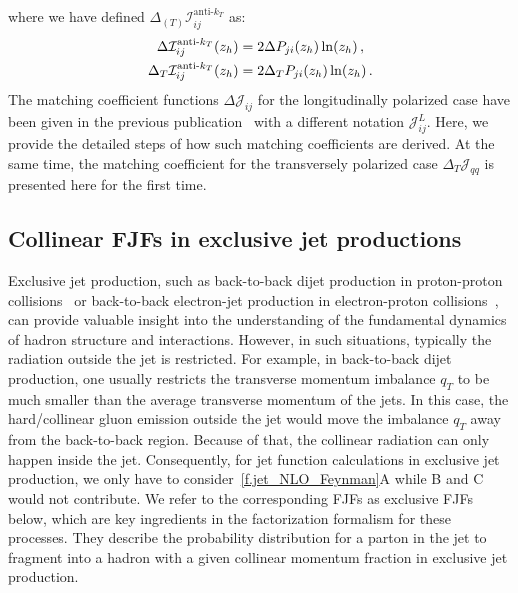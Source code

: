 \documentclass[a4paper, 11 pt]{article}
\begin{document}
where we have defined $\Delta_{(T)} \mathcal{I}_{ij}^{\text{anti-}k_T}$ as:
\begin{equation}
\begin{split}
\Delta \mathcal{I}_{ij}^{\text{anti-}k_T} \pqty{z_h}
& =
2 \Delta P_{ji} \pqty{z_h} \ln(z_h)
\, , \\
\Delta _T \mathcal{I}_{ij}^{\text{anti-}k_T} \pqty{z_h}
& =
2 \Delta _T P_{ji} \pqty{z_h} \ln(z_h)
\, . \\
\end{split}
\end{equation}
The matching coefficient functions $\Delta\mathcal{J}_{ij}$ for the longitudinally polarized case have been given in the previous publication~\cite{Kang:2020xyq} with a different notation $\mathcal{J}^L_{ij}$. Here, we provide the detailed steps of how such matching coefficients are derived. At the same time, the matching coefficient for the transversely polarized case $\Delta_T\mathcal{J}_{qq}$ is presented here for the first time. 


\subsection{Collinear FJFs in exclusive jet productions}
\label{ss.collinear_exclusive_FJFs}

Exclusive jet production, such as back-to-back dijet production in proton-proton collisions~\cite{Kang:2020xez,Gao:2023ulg} or back-to-back electron-jet production in electron-proton collisions~\cite{Liu:2018trl}, can provide valuable insight into the understanding of the fundamental dynamics of hadron structure and interactions. However, in such situations, typically the radiation outside the jet is restricted. For example, in back-to-back dijet production, one usually restricts the transverse momentum imbalance $q_T$ to be much smaller than the average transverse momentum of the jets. In this case, the hard/collinear gluon emission outside the jet would move the imbalance $q_T$ away from the back-to-back region. Because of that, the collinear radiation can only happen inside the jet. Consequently, for jet function calculations in exclusive jet production, we only have to consider~\cref{f.jet_NLO_Feynman}A while B and C would not contribute. We refer to the corresponding FJFs as exclusive FJFs below, which are key ingredients in the factorization formalism for these processes. They describe the probability distribution for a parton in the jet to fragment into a hadron with a given collinear momentum fraction in exclusive jet production. 
\end{document}
